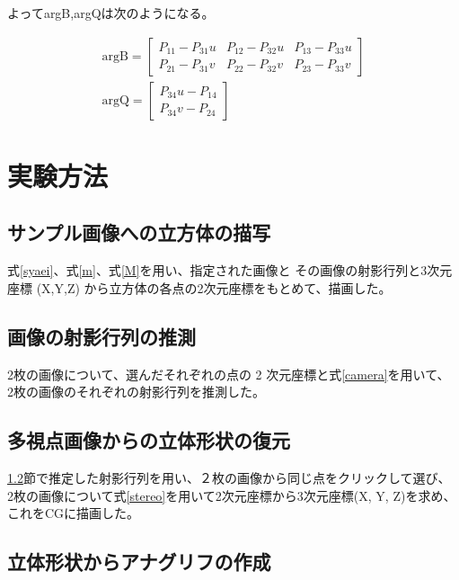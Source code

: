 \documentclass[11pt,a4j]{jsarticle}
\begin{document}
よってargB,argQは次のようになる。

\begin{align}
  \mathrm{argB} =
  \left[
    \begin{array}{ccc}
      P_{11} - P_{31}u & P_{12} - P_{32}u & P_{13} - P_{33}u \\
      P_{21} - P_{31}v & P_{22} - P_{32}v & P_{23} - P_{33}v
    \end{array}
  \right]
  \label{argB} \\[0.5cm]
  \mathrm{argQ} =
  \left[
    \begin{array}{c}
      P_{34}u - P_{14} \\
      P_{34}v - P_{24}
    \end{array}
  \right]
  \label{argB}
\end{align}

\section{実験方法}
\label{sec:実験方法}

\subsection{サンプル画像への立方体の描写}
\label{sub:サンプル画像への立方体の描写}
式\ref{syaei}、式\ref{m}、式\ref{M}を用い、指定された画像と
その画像の射影行列と3次元座標 (X,Y,Z) から立方体の各点の2次元座標をもとめて、描画した。

\subsection{画像の射影行列の推測}
\label{sub:画像の射影行列の推測}
2枚の画像について、選んだそれぞれの点の 2 次元座標と式\ref{camera}を用いて、
2枚の画像のそれぞれの射影行列を推測した。

\subsection{多視点画像からの立体形状の復元}
\label{sub:多視点画像からの立体形状の復元}
\ref{sub:画像の射影行列の推測}節で推定した射影行列を用い、２枚の画像から同じ点をクリックして選び、
2枚の画像について式\ref{stereo}を用いて2次元座標から3次元座標(X, Y, Z)を求め、これをCGに描画した。


\subsection{立体形状からアナグリフの作成}
\label{sub:立体形状からアナグリフの作成}
\end{document}
